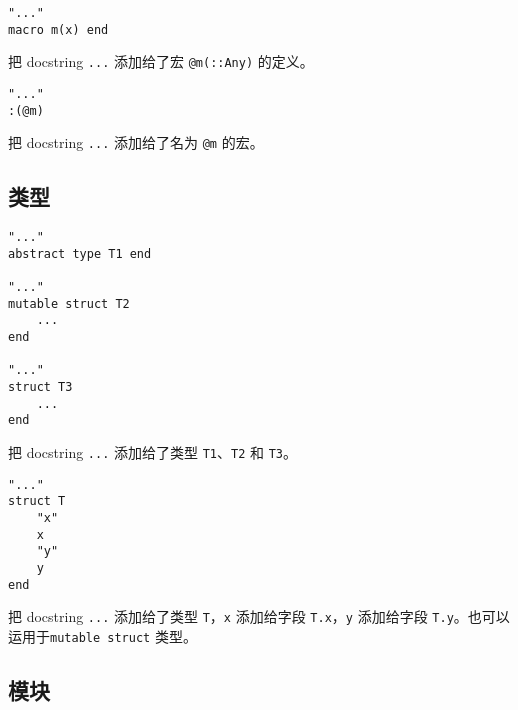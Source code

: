 \begin{verbatim}
"..."
macro m(x) end
\end{verbatim}



把 docstring \texttt{{\textquotedbl}...{\textquotedbl}} 添加给了宏 \texttt{@m(::Any)} 的定义。




\begin{verbatim}
"..."
:(@m)
\end{verbatim}



把 docstring \texttt{{\textquotedbl}...{\textquotedbl}} 添加给了名为 \texttt{@m} 的宏。



\hypertarget{5145884598618557277}{}


\subsection{类型}




\begin{lstlisting}
"..."
abstract type T1 end

"..."
mutable struct T2
    ...
end

"..."
struct T3
    ...
end
\end{lstlisting}



把 docstring \texttt{{\textquotedbl}...{\textquotedbl}} 添加给了类型 \texttt{T1}、\texttt{T2} 和 \texttt{T3}。




\begin{verbatim}
"..."
struct T
    "x"
    x
    "y"
    y
end
\end{verbatim}



把 docstring \texttt{{\textquotedbl}...{\textquotedbl}} 添加给了类型 \texttt{T}，\texttt{{\textquotedbl}x{\textquotedbl}} 添加给字段 \texttt{T.x}，\texttt{{\textquotedbl}y{\textquotedbl}} 添加给字段 \texttt{T.y}。也可以运用于\texttt{mutable struct} 类型。



\hypertarget{18307601734386005108}{}


\subsection{模块}




